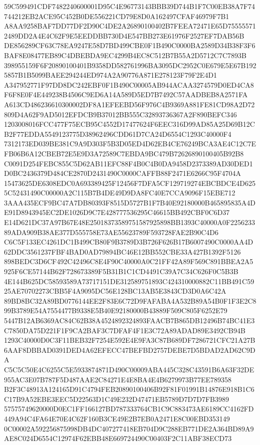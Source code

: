 \documentclass[UTF8,fontset=fandol,zihao=-4,a4paper]{ctexart}
\begin{document}
{{59C599491CDF7482240600001D95C4E96773143BBB39D744B1F7C00EB38A7F74744212EB2ACE95C452B0DE556221CD79E8D0A162497CFAF46979F7B1
A8AA9258BAF7DD77DF2D90C4DE2A26890100402B7FEEA72471E65D755555712489DD2A4E4C62F9E5EEDDBB730D4E547BB273E61976F2527EF7DAB56B
DE856289CF63C78EA9247E58D7BD499CBE0F1B490C0000BA2589D34B38F3F6BAF8E08477EB89C4DBEBDA9EC4299B4EC8C512B7B55A2D5712C7C7893B
398955159F6F20890100401B9358DD582761996BA3095DC2952C0E679E5E67B1925857B1B5099BAEE294244ED974A2A90776A871E278123F79F2E4D1
A347952771F97DD8DC242EBF0F1B490C00005AB944ACAA3274579D0ED4CA8F6F8E0F4E449238B4506C9ED6A14A589D5ED7B7492C57AADBEB8A2571FA
A613CD486236610300002DF8A1EFEEBD56F976C4B9369A881FE81CD98A2D72809D4A62F9AD5012EFDCB9B37012BB555C32893736367A2F890BEFC346
1203008016FCC477F75ECB95C4552D17477624F6EEC316D99AD85A25D69B12CB2F77EDDA5549123775D38962496CDD61D7CA24D6554C1293C40000F4
7312173ED039BE381C9A9D303F5B3D05ED4D62EB4CE76249BCA3AE4C12C7EFB06B6A12CBEB72E5E9D3A72589C7EBDA9BC479B72626890100405B92B8
C0091D254FEBC855C5D62AB11EFC88F4B0C4B0DA9458D2373389AD30DED1D0BC2436379D484CE2870D2431490C0000CAFFB88F2471E6266C95F4704A
15473625DE6308EDC0A693389425F12456F7DFA5CF129719274EBCBDCE4D6255C52431490C00000A2C115B7B4DE49D9DA8FC40E7CCA9096F15EBE712
3AAA435ECF9BC47A7DB80393F8515D5727B1F7B40E92180000B465895835A4DE91D8943945EC2DE1026D9C7E428777536295C46615BB492CBF0C6D37
E14D621DC37A97B67E48E25018373589751587925898BB1393C40000A0F225623389ADA909B38AE377D555758E73AE55623789F593728FAE2B90C4D6
C6C5F133EC4261DC1B499CB80F9B3789D3B726F626B17B6007490C0000AA4D62DDC3561237FBF4BAD0AD79894BC46E12BB552CBE33A427B1392F5126
898BEDC3D6CF492C42496C8E4F90C40000A0C21FF42A89F569C891BBEA2A5925F6CE57144B62F728673389F5B31B1C1CD4491C39A7C34C626F0C5B3B
4E144B625DC58593589A73717151DE312589751893C424310000882C11BB491C5925AE70702273CBB5F4A9095DC56E128BC13AB5E3843CD3D0A6C42A
89BD8BC32A89BD0776144EE2F83E6C72D9FAFABA4A532B89A54B0F1F3E2C899B3789E54A7554477B9338E5B40E92180000B43889F509C805F6252E79
5447B12AB6369AC84C62B38A4524892324893FAACB7B865DB12496B74BC41E3C7850DA75D221F1F9CA2BAF3C7DFAF4F1E3C72A89ADAD89E3492CB94B
1293C40000D0C3F11BEB32F7254E592E4E9FA3C87B689DF7286721CFC21A27B6AAF8DBBAD0391DED4A62EFECC47BEFBD2757DEBE7D5BDAD2AD62C9DA
C5C5C50E4C6255C5E5933874871D490C00009ABA445C328C43591B6A63F32DE955AC3E07B787F5D487AAE2C84271E4E8BA4E4B6279973B77EE789358
B2F3C48913A124165D91C4794FEB20890100406B92F81F01991B14876E918B1C6C17B9A52EBE3EEC5D22563D1C49E232D47471EB5789D7D7D7FB3989
57575749620000D0EC1FF166127BD787333764CB1C9C883473AE6189CC4162FD449A94C4FA64E70E4C62F160B3CE49E2B7EB0A2471E8C00EBD353149
0C00002A592256875998DB4DC407277418EB704D9C288EB771DE2A364BD89A9AE8C024D6554C12974F62EBB48E669724490C00403F2C11ABF38ECD73
}}
\end{document}
